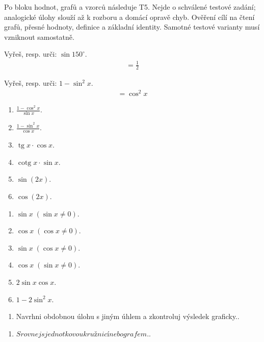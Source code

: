 \documentclass[11pt,a4paper]{article}
\begin{document}
Po bloku hodnot, grafů a vzorců následuje T5. Nejde o schválené testové zadání; analogické úlohy slouží až k rozboru a domácí opravě chyb.
Ověření cílí na čtení grafů, přesné hodnoty, definice a základní identity. Samotné testové varianty musí vzniknout samostatně.
\begin{prikladReseniBox}[title={Příklad 1}]
Vyřeš, resp. urči: $\sin150^\circ$.
\tcblower
\[\begin{aligned}=\frac{1}{2}\end{aligned}\]
\end{prikladReseniBox}
\begin{prikladReseniBox}[title={Příklad 2}]
Vyřeš, resp. urči: $1-\sin^2x$.
\tcblower
\[\begin{aligned}=\cos^2x\end{aligned}\]
\end{prikladReseniBox}
\begin{zadaniReseniBox}[title={Samostatná práce 1}]
\begin{enumerate}[label=\alph*)]
\item $\frac{1-\cos^2x}{\sin x}$.
\item $\frac{1-\sin^2x}{\cos x}$.
\item $\operatorname{tg}x\cdot\cos x$.
\item $\operatorname{cotg}x\cdot\sin x$.
\item $\sin(2x)$.
\item $\cos(2x)$.
\end{enumerate}
\tcblower
\begin{enumerate}[label=\alph*)]
\item $\sin x\;(\sin x\ne0)$.
\item $\cos x\;(\cos x\ne0)$.
\item $\sin x\;(\cos x\ne0)$.
\item $\cos x\;(\sin x\ne0)$.
\item $2\sin x\cos x$.
\item $1-2\sin^2x$.
\end{enumerate}
\end{zadaniReseniBox}
\begin{zadaniReseniBox}[title={Rozšíření 1}]
\begin{enumerate}[label=\alph*)]
\item Navrhni obdobnou úlohu s jiným úhlem a zkontroluj výsledek graficky..
\end{enumerate}
\tcblower
\begin{enumerate}[label=\alph*)]
\item $Srovnej s jednotkovou kružnicí nebo grafem.$.
\end{enumerate}
\end{zadaniReseniBox}
\end{document}
